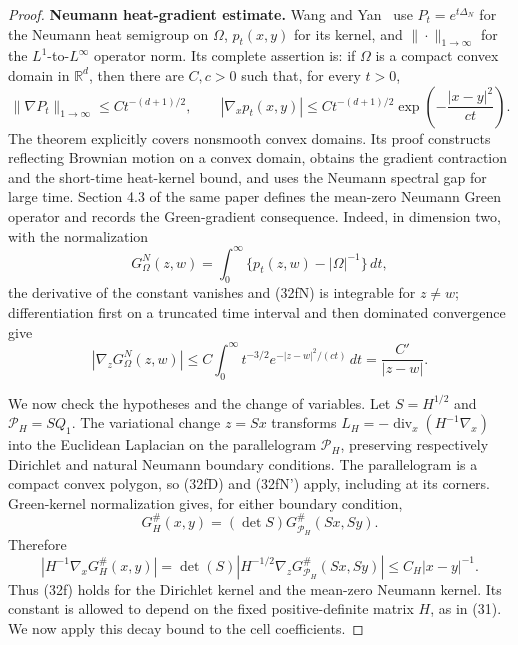 \documentclass{smfart}
\theoremstyle{definition}
\newcommand{\1}{\mathbf 1}
\begin{document}
\begin{proof}
\textbf{Neumann heat-gradient estimate.}  Wang and Yan~\cite[Theorem 1.2]{WangYan2010} use $P_ t=e^{t\Delta_ N}$ for the
Neumann heat semigroup on $\Omega$, $p_ t(x,y)$ for its kernel, and
$\|\cdot\|_ {1\to\infty}$ for the $L^1$-to-$L^\infty$ operator norm.
Its complete assertion is: if $\Omega$ is a compact convex domain in
$\mathbb R^d$, then there are $C,c>0$ such that, for every $t>0$,
\begin{equation}
\|\nabla P_ t\|_ {1\to\infty}\leq Ct^{-(d+1)/2},
\qquad
|\nabla_ xp_ t(x,y)|\leq Ct^{-(d+1)/2}
\exp\!\left(-\frac{|x-y|^2}{ct}\right).
\tag{32fN}
\end{equation}
The theorem explicitly covers nonsmooth convex domains.  Its proof
constructs reflecting Brownian motion on a convex domain, obtains the
gradient contraction and the short-time heat-kernel bound, and uses the
Neumann spectral gap for large time.  Section 4.3 of the same paper defines
the mean-zero Neumann Green operator and records the Green-gradient
consequence.  Indeed, in dimension two, with the normalization
\begin{equation*}
G^N_ \Omega(z,w)=\int_ 0^\infty
\{p_ t(z,w)-|\Omega|^{-1}\}\,dt,
\end{equation*}
the derivative of the constant vanishes and (32fN) is integrable for
$z\ne w$; differentiation first on a truncated time interval and then
dominated convergence give
\begin{equation}
|\nabla_ zG^N_ \Omega(z,w)|
\leq C\int_ 0^\infty t^{-3/2}
e^{-|z-w|^2/(ct)}\,dt
=\frac{C'}{|z-w|}.
\tag{32fN'}
\end{equation}

We now check the hypotheses and the change of variables.  Let
$S=H^{1/2}$ and $\mathcal P_ H=SQ_ 1$.  The variational change
$z=Sx$ transforms
$L_ H=-\operatorname {div}_ x(H^{-1}\nabla_ x)$ into the Euclidean
Laplacian on the parallelogram $\mathcal P_ H$, preserving respectively
Dirichlet and natural Neumann boundary conditions.  The parallelogram is
a compact convex polygon, so (32fD) and (32fN') apply, including at its
corners.  Green-kernel normalization gives, for either boundary condition,
\begin{equation*}
G_ H^\#(x,y)=(\det S)G_ {\mathcal P_ H}^\#(Sx,Sy).
\end{equation*}
Therefore
\begin{equation}
|H^{-1}\nabla_ xG_ H^\#(x,y)|
=\det(S)|H^{-1/2}\nabla_ zG_ {\mathcal P_ H}^\#(Sx,Sy)|
\leq C_ H|x-y|^{-1}.
\tag{32f}
\end{equation}
Thus (32f) holds for the Dirichlet kernel and the mean-zero Neumann
kernel.  Its constant is allowed to depend on the fixed
positive-definite matrix $H$, as in (31).  We now apply this decay
bound to the cell coefficients.


\end{proof}
\end{document}
